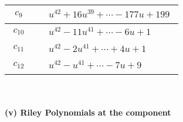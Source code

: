 \documentclass[1p]{elsarticle_modified}
\theoremstyle{definition}
\begin{document}
\begin{tabular}{m{50pt}|m{274pt}}
\hline $$\begin{aligned}c_{9}\end{aligned}$$&$\begin{aligned}
&u^{42}+16 u^{39}+\cdots-177 u+199
\end{aligned}$\\
\hline $$\begin{aligned}c_{10}\end{aligned}$$&$\begin{aligned}
&u^{42}-11 u^{41}+\cdots-6 u+1
\end{aligned}$\\
\hline $$\begin{aligned}c_{11}\end{aligned}$$&$\begin{aligned}
&u^{42}-2 u^{41}+\cdots+4 u+1
\end{aligned}$\\
\hline $$\begin{aligned}c_{12}\end{aligned}$$&$\begin{aligned}
&u^{42}- u^{41}+\cdots-7 u+9
\end{aligned}$\\
\hline
\end{tabular}\\~\\
\newpage\renewcommand{\arraystretch}{1}
\flushleft \textbf{(v) Riley Polynomials at the component}\newline \\
\end{document}
